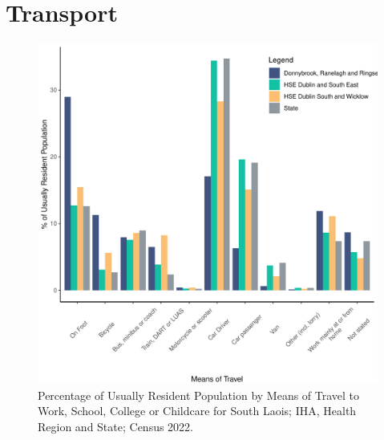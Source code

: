 \documentclass{article}
\begin{document}
\section{Transport}\label{sect:Trans}
\begin{figure}[H]
	\centering
	\includegraphics[width = 120mm]{../figures/TravelED.pdf}
	\caption{Percentage of Usually Resident Population by Means of Travel to Work, School, College or Childcare for South Laois; IHA, Health Region and State; Census 2022.}
	\label{fig:vbnv}
	\end{figure}
\end{document}

